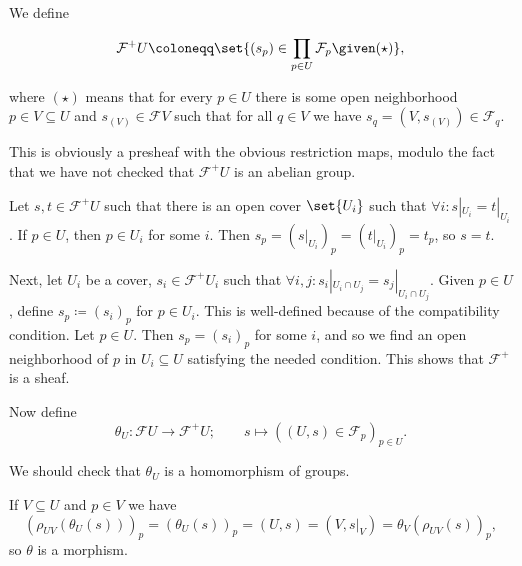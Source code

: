 We define

\[ \mathcal{F}^+U\coloneqq\set{(s_p) \in \prod_{p \in U} \mathcal{F}_p\given (\star)}, \]

where $(\star)$ means that for every $p \in U$ there is some open neighborhood
$p \in V \subseteq U$ and $s_{(V)} \in \mathcal{F}V$ such that for all $q \in V$
we have $s_q = (V, s_{(V)}) \in \mathcal{F}_q$.

This is obviously a presheaf with the obvious restriction maps, modulo
the fact that we have not checked that $\mathcal{F}^+U$ is an abelian group.

Let $s, t \in \mathcal{F}^+U$ such that there is an open cover $\set{U_i}$ such
that $\forall i\colon s|_{U_i} = t|_{U_i}$. If $p \in U$, then $p \in U_i$ for
some $i$. Then $s_p = (s|_{U_i})_p = (t|_{U_i})_p = t_p$, so  $s = t$.

Next, let $U_i$ be a cover, $s_i \in \mathcal{F}^+U_i$ such that $\forall i, j\colon s_i|_{U_i\cap U_j}=s_j|_{U_i\cap U_j}$.
Given $p \in U$, define $s_p\coloneqq (s_i)_p$ for $p \in U_i$. This is well-defined
because of the compatibility condition. Let $p \in U$. Then $s_p = (s_i)_p$ for
some $i$, and so we find an open neighborhood of $p$ in $U_i \subseteq U$ satisfying
the needed condition. This shows that $\mathcal{F}^+$ is a sheaf.

Now define
\[ \theta_U\colon \mathcal{F}U\to \mathcal{F}^+U;\qquad s\mapsto ((U, s) \in \mathcal{F}_p)_{p \in U}. \]

We should check that $\theta_U$ is a homomorphism of groups.

If $V \subseteq U$ and $p \in V$ we have
\[ (\rho_{UV}(\theta_U(s)))_p = (\theta_U(s))_p = (U, s) = (V, s|_V) = \theta_V(\rho_{UV}(s))_p, \]
so $\theta$ is a morphism.
